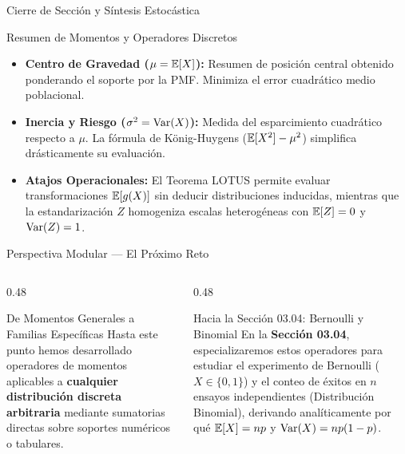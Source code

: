 \documentclass[10pt, aspectratio=169]{beamer}
\begin{document}
\begin{frame}{Cierre de Sección y Síntesis Estocástica}
  \begin{block}{Resumen de Momentos y Operadores Discretos}
    \footnotesize
    \begin{itemize}\itemsep=0.1cm
      \item \textbf{Centro de Gravedad ($\mu = \mathbb{E}[X]$):} Resumen de posición central obtenido ponderando el soporte por la PMF. Minimiza el error cuadrático medio poblacional.
      \item \textbf{Inercia y Riesgo ($\sigma^2 = \operatorname{Var}(X)$):} Medida del esparcimiento cuadrático respecto a $\mu$. La fórmula de König-Huygens ($\mathbb{E}[X^2] - \mu^2$) simplifica drásticamente su evaluación.
      \item \textbf{Atajos Operacionales:} El Teorema LOTUS permite evaluar transformaciones $\mathbb{E}[g(X)]$ sin deducir distribuciones inducidas, mientras que la estandarización $Z$ homogeniza escalas heterogéneas con $\mathbb{E}[Z]=0$ y $\operatorname{Var}(Z)=1$.
    \end{itemize}
  \end{block}
\end{frame}

\begin{frame}{Perspectiva Modular — El Próximo Reto}
  \begin{columns}[T]
    \begin{column}{0.48\textwidth}
      \begin{block}{De Momentos Generales a Familias Específicas}
        \footnotesize
        Hasta este punto hemos desarrollado operadores de momentos aplicables a \textbf{cualquier distribución discreta arbitraria} mediante sumatorias directas sobre soportes numéricos o tabulares.
      \end{block}
    \end{column}
    \begin{column}{0.48\textwidth}
      \pause
      \begin{alertblock}{Hacia la Sección 03.04: Bernoulli y Binomial}
        \footnotesize
        En la \textbf{Sección 03.04}, especializaremos estos operadores para estudiar el experimento de Bernoulli ($X \in \{0, 1\}$) y el conteo de éxitos en $n$ ensayos independientes (Distribución Binomial), derivando analíticamente por qué $\mathbb{E}[X] = np$ y $\operatorname{Var}(X) = np(1-p)$.
      \end{alertblock}
    \end{column}
  \end{columns}
\end{frame}
\end{document}
